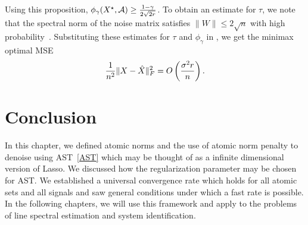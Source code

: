 Using this proposition, $\phi_\gamma(X^\star,\mathcal{A}) \geq
\frac{1-\gamma}{2\sqrt{2r}}$. To obtain an estimate for $\tau$, we note that
the spectral norm of the noise matrix satisfies $\|W\|\leq
2\sqrt{n}$ with high probability~\cite{Davidson01}. Substituting these
estimates for $\tau$ and $\phi_\gamma$ in , we get
the minimax optimal MSE
\begin{align*}
\frac{1}{n^2}\lVert X-\hat{X}\rVert_F^2 = O\left( \frac{\sigma^2 r}{n} \right).
\end{align*}


\section{Conclusion} %
\label{sec:ast:conclusion}
In this chapter, we defined atomic norms and the use of atomic norm penalty to
denoise using AST~\eqref{AST} which may be thought of as a infinite dimensional
version of Lasso. We discussed how the regularization parameter may be chosen
for AST. We established a universal convergence rate which holds for all atomic
sets and all signals and saw general conditions under which a fast rate is
possible. In the following chapters, we will use this framework and apply to the
problems of line spectral estimation and system identification.
